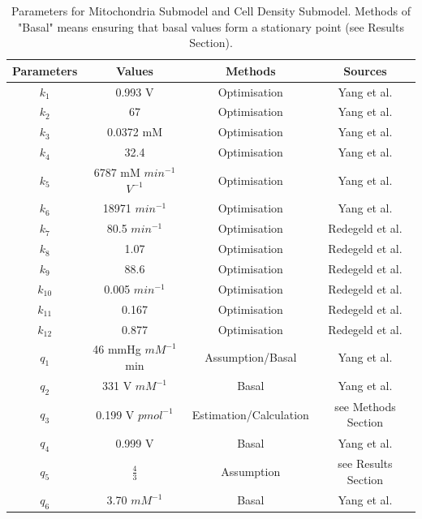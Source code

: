 \documentclass[12pt]{article}
\begin{document}
\begin{table}[]
    \centering
\begin{tabular}{|c | c| c|c|} 
 \hline
 \textbf{Parameters} & \textbf{Values} &\textbf{Methods}& \textbf{Sources}\\
 \hline\hline
 $k_1$ & 0.993 V  & Optimisation & Yang et al. \cite{y.yangMITOsymMechanisticMathematical2015}\\ 
\hline
 $k_2$ & 67  & Optimisation & Yang et al. \cite{y.yangMITOsymMechanisticMathematical2015}\\ 
\hline
 $k_3$ & 0.0372 mM  & Optimisation & Yang et al. \cite{y.yangMITOsymMechanisticMathematical2015}\\ 
\hline
 $k_4$ & 32.4  & Optimisation & Yang et al. \cite{y.yangMITOsymMechanisticMathematical2015}\\ 
\hline
 $k_5$ & 6787 mM $min^{-1}$ $V^{-1}$  & Optimisation & Yang et al. \cite{y.yangMITOsymMechanisticMathematical2015}\\ 
\hline
 $k_6$ & 18971 $min^{-1}$ & Optimisation & Yang et al. \cite{y.yangMITOsymMechanisticMathematical2015}\\ 
\hline
 $k_7$ & 80.5 $min^{-1}$  & Optimisation & Redegeld et al. \cite{redegeldDepletionATPNot1992,redegeldInteractionCellularATP1990}\\ 
\hline
 $k_8$ & 1.07  & Optimisation & Redegeld et al. \cite{redegeldDepletionATPNot1992,redegeldInteractionCellularATP1990}\\ 
\hline
 $k_9$ & 88.6  & Optimisation & Redegeld et al. \cite{redegeldDepletionATPNot1992,redegeldInteractionCellularATP1990}\\ 
\hline
 $k_{10}$ & 0.005 $min^{-1}$ & Optimisation & Redegeld et al. \cite{redegeldDepletionATPNot1992,redegeldInteractionCellularATP1990}\\ 
\hline
 $k_{11}$ & 0.167  & Optimisation & Redegeld et al. \cite{redegeldDepletionATPNot1992,redegeldInteractionCellularATP1990}\\ 
\hline
 $k_{12}$ & 0.877 & Optimisation & Redegeld et al. \cite{redegeldDepletionATPNot1992,redegeldInteractionCellularATP1990}\\ 
\hline
 $q_1$ & 46 mmHg $mM^{-1}$ min  & Assumption/Basal & Yang et al. \cite{y.yangMITOsymMechanisticMathematical2015}\\
\hline
 $q_2$ & 331 V $mM^{-1}$  & Basal & Yang et al. \cite{y.yangMITOsymMechanisticMathematical2015}\\
\hline
 $q_3$ & 0.199 V $pmol^{-1}$ & Estimation/Calculation & see Methods Section\\
\hline
 $q_4$ & 0.999 V   & Basal& Yang et al. \cite{y.yangMITOsymMechanisticMathematical2015}\\
\hline
 $q_5$ & $\frac{4}{3}$   & Assumption & see Results Section\\
\hline
 $q_6$ & 3.70 $mM^{-1}$  & Basal & Yang et al. \cite{y.yangMITOsymMechanisticMathematical2015}\\
\hline
\end{tabular}
\caption{Parameters for Mitochondria Submodel and Cell Density Submodel. Methods of "Basal" means ensuring that basal values form a stationary point (see Results Section).}
\label{Tab:para}
\end{table}
\end{document}
